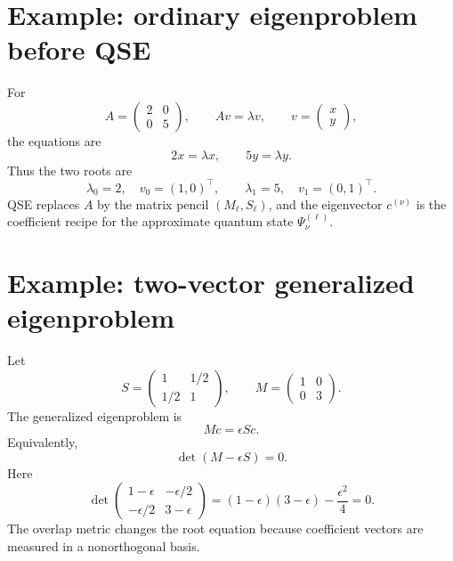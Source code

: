 \documentclass[10pt,twocolumn]{article}
\begin{document}
\section{Example: ordinary eigenproblem before QSE}

For
\begin{equation}
A=
\begin{pmatrix}
2&0\\0&5
\end{pmatrix},
\qquad
Av=\lambda v,
\qquad
v=\begin{pmatrix}x\\y\end{pmatrix},
\end{equation}
the equations are
\begin{equation}
2x=\lambda x,\qquad 5y=\lambda y.
\end{equation}
Thus the two roots are
\begin{equation}
\lambda_0=2,\quad v_0=(1,0)^\top,
\qquad
\lambda_1=5,\quad v_1=(0,1)^\top.
\end{equation}
QSE replaces \(A\) by the matrix pencil \((M_\ell,S_\ell)\), and the eigenvector \(c^{(\nu)}\) is the coefficient recipe for the approximate quantum state \(\Psi_\nu^{(\ell)}\).

\section{Example: two-vector generalized eigenproblem}

Let
\begin{equation}
S=
\begin{pmatrix}
1&1/2\\
1/2&1
\end{pmatrix},
\qquad
M=
\begin{pmatrix}
1&0\\
0&3
\end{pmatrix}.
\end{equation}
The generalized eigenproblem is
\begin{equation}
Mc=\epsilon Sc.
\end{equation}
Equivalently,
\begin{equation}
\det(M-\epsilon S)=0.
\end{equation}
Here
\begin{equation}
\det
\begin{pmatrix}
1-\epsilon&-\epsilon/2\\
-\epsilon/2&3-\epsilon
\end{pmatrix}
=(1-\epsilon)(3-\epsilon)-\frac{\epsilon^2}{4}=0.
\end{equation}
The overlap metric changes the root equation because coefficient vectors are measured in a nonorthogonal basis.
\end{document}
